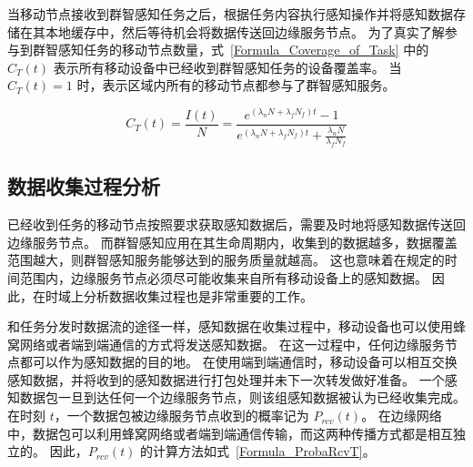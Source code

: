 
当移动节点接收到群智感知任务之后，根据任务内容执行感知操作并将感知数据存储在其本地缓存中，然后等待机会将数据传送回边缘服务节点。
为了真实了解参与到群智感知任务的移动节点数量，式~\eqref{Formula_Coverage_of_Task} 中的 $C_T(t)$ 表示所有移动设备中已经收到群智感知任务的设备覆盖率。
当 $C_T(t)=1$ 时，表示区域内所有的移动节点都参与了群智感知服务。

\begin{equation}
  \label{Formula_Coverage_of_Task}
  C_T(t) = \frac{I(t)}{N} = \frac{e^{(\lambda_n N + \lambda_f N_f) t} - 1}{e^{(\lambda_n N + \lambda_f N_f) t} + \frac{\lambda_n N}{\lambda_f N_f}}
\end{equation}

\subsection{数据收集过程分析}

已经收到任务的移动节点按照要求获取感知数据后，需要及时地将感知数据传送回边缘服务节点。
而群智感知应用在其生命周期内，收集到的数据越多，数据覆盖范围越大，则群智感知服务能够达到的服务质量就越高。
这也意味着在规定的时间范围内，边缘服务节点必须尽可能收集来自所有移动设备上的感知数据。
因此，在时域上分析数据收集过程也是非常重要的工作。


和任务分发时数据流的途径一样，感知数据在收集过程中，移动设备也可以使用蜂窝网络或者端到端通信的方式将发送感知数据。
在这一过程中，任何边缘服务节点都可以作为感知数据的目的地。
在使用端到端通信时，移动设备可以相互交换感知数据，并将收到的感知数据进行打包处理并未下一次转发做好准备。
一个感知数据包一旦到达任何一个边缘服务节点，则该组感知数据被认为已经收集完成。
在时刻 $t$，一个数据包被边缘服务节点收到的概率记为 $P_{rcv}(t)$。
在边缘网络中，数据包可以利用蜂窝网络或者端到端通信传输，而这两种传播方式都是相互独立的。
因此，$P_{rcv}(t)$ 的计算方法如式~\eqref{Formula_ProbaRcvT}。

